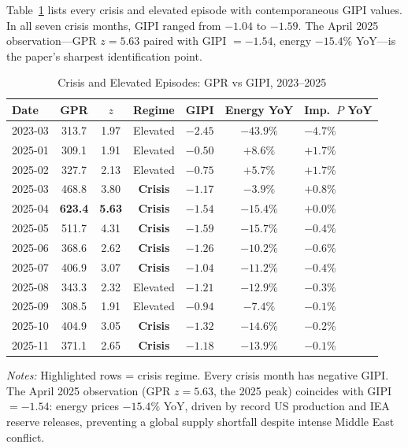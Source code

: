 \documentclass[12pt]{article}
\begin{document}
Table~\ref{tab:decouple} lists every crisis and elevated episode with
contemporaneous GIPI values.
In all seven crisis months, GIPI ranged from $-1.04$ to $-1.59$.
The April 2025 observation---GPR $z = 5.63$ paired with GIPI $= -1.54$,
energy $-15.4\%$ YoY---is the paper's sharpest identification point.

\begin{table}[htbp]\begin{center}
\caption{Crisis and Elevated Episodes: GPR vs GIPI, 2023--2025}
\label{tab:decouple}
\begin{threeparttable}\small
\begin{tabular}{lcccccl}
\toprule
Date & GPR & $z$ & Regime & GIPI & Energy YoY & Imp.\ $P$ YoY\\
\midrule
2023-03 & 313.7 & 1.97 & Elevated & $-2.45$ & $-43.9\%$ & $-4.7\%$\\
2025-01 & 309.1 & 1.91 & Elevated & $-0.50$ & $+8.6\%$ & $+1.7\%$\\
2025-02 & 327.7 & 2.13 & Elevated & $-0.75$ & $+5.7\%$ & $+1.7\%$\\
\rowcolor{yellow!15}
2025-03 & 468.8 & 3.80 & \textbf{Crisis} & $-1.17$ & $-3.9\%$ & $+0.8\%$\\
\rowcolor{yellow!15}
2025-04 & \textbf{623.4} & \textbf{5.63} & \textbf{Crisis} & $-1.54$ & $-15.4\%$ & $+0.0\%$\\
\rowcolor{yellow!15}
2025-05 & 511.7 & 4.31 & \textbf{Crisis} & $-1.59$ & $-15.7\%$ & $-0.4\%$\\
\rowcolor{yellow!15}
2025-06 & 368.6 & 2.62 & \textbf{Crisis} & $-1.26$ & $-10.2\%$ & $-0.6\%$\\
\rowcolor{yellow!15}
2025-07 & 406.9 & 3.07 & \textbf{Crisis} & $-1.04$ & $-11.2\%$ & $-0.4\%$\\
2025-08 & 343.3 & 2.32 & Elevated & $-1.21$ & $-12.9\%$ & $-0.3\%$\\
2025-09 & 308.5 & 1.91 & Elevated & $-0.94$ & $-7.4\%$ & $-0.1\%$\\
\rowcolor{yellow!15}
2025-10 & 404.9 & 3.05 & \textbf{Crisis} & $-1.32$ & $-14.6\%$ & $-0.2\%$\\
\rowcolor{yellow!15}
2025-11 & 371.1 & 2.65 & \textbf{Crisis} & $-1.18$ & $-13.9\%$ & $-0.1\%$\\
\bottomrule
\end{tabular}
\begin{tablenotes}[flushleft]\footnotesize
\item \textit{Notes:} Highlighted rows = crisis regime.
Every crisis month has negative GIPI.
The April 2025 observation (GPR $z = 5.63$, the 2025 peak) coincides with
GIPI $= -1.54$: energy prices $-15.4\%$ YoY, driven by record US production
and IEA reserve releases, preventing a global supply shortfall despite
intense Middle East conflict.
\end{tablenotes}
\end{threeparttable}
\end{center}\end{table}
\end{document}

